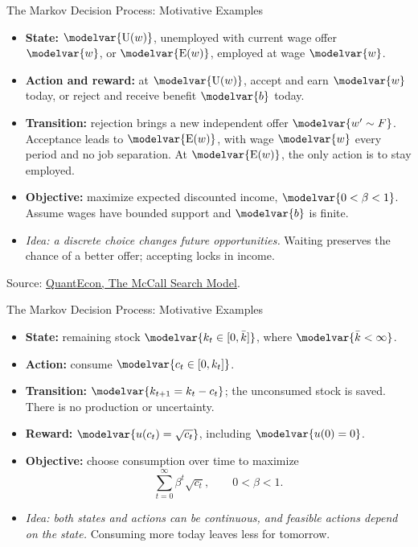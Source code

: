 \begin{frame}{The Markov Decision Process: Motivative Examples}
\small
{}
\begin{itemize}
  \item \textbf{State:} \(\modelvar{\mathrm U(w)}\), unemployed with current wage offer \(\modelvar{w}\), or \(\modelvar{\mathrm E(w)}\), employed at wage \(\modelvar{w}\).
  \item \textbf{Action and reward:} at \(\modelvar{\mathrm U(w)}\), accept and earn \(\modelvar{w}\) today, or reject and receive benefit \(\modelvar{b}\) today.
  \item \textbf{Transition:} rejection brings a new independent offer \(\modelvar{w'\sim F}\). Acceptance leads to \(\modelvar{\mathrm E(w)}\), with wage \(\modelvar{w}\) every period and no job separation. At \(\modelvar{\mathrm E(w)}\), the only action is to stay employed.
  \item \textbf{Objective:} maximize expected discounted income, \(\modelvar{0<\beta<1}\). Assume wages have bounded support and \(\modelvar{b}\) is finite.
  \item \textit{Idea: a discrete choice changes future opportunities.} Waiting preserves the chance of a better offer; accepting locks in income.
\end{itemize}
{\footnotesize Source: \href{https://python.quantecon.org/mccall_model.html}{QuantEcon, The McCall Search Model}.}
\end{frame}

\begin{frame}{The Markov Decision Process: Motivative Examples}
\begin{itemize}
  \item \textbf{State:} remaining stock \(\modelvar{k_t\in[0,\bar k]}\), where \(\modelvar{\bar k<\infty}\).
  \item \textbf{Action:} consume \(\modelvar{c_t\in[0,k_t]}\).
  \item \textbf{Transition:} \(\modelvar{k_{t+1}=k_t-c_t}\); the unconsumed stock is saved. There is no production or uncertainty.
  \item \textbf{Reward:} \(\modelvar{u(c_t)=\sqrt{c_t}}\), including \(\modelvar{u(0)=0}\).
  \item \textbf{Objective:} choose consumption over time to maximize
  \[\sum_{t=0}^{\infty}\beta^t\sqrt{c_t},\qquad 0<\beta<1.\]
  \item \textit{Idea: both states and actions can be continuous, and feasible actions depend on the state.} Consuming more today leaves less for tomorrow.
\end{itemize}
\end{frame}

